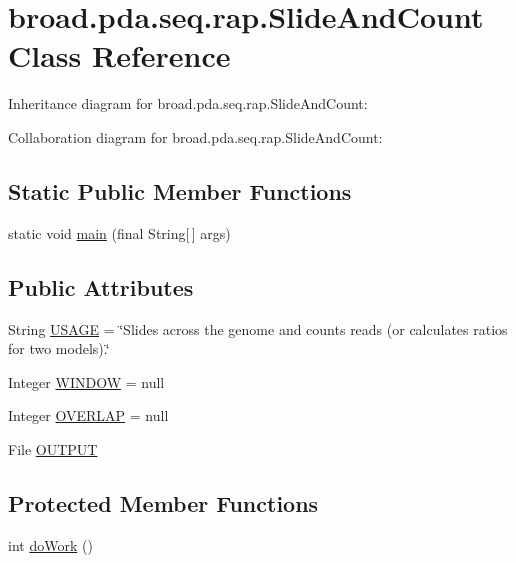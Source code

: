 \hypertarget{classbroad_1_1pda_1_1seq_1_1rap_1_1_slide_and_count}{\section{broad.\+pda.\+seq.\+rap.\+Slide\+And\+Count Class Reference}
\label{classbroad_1_1pda_1_1seq_1_1rap_1_1_slide_and_count}
}


Inheritance diagram for broad.\+pda.\+seq.\+rap.\+Slide\+And\+Count\+:


Collaboration diagram for broad.\+pda.\+seq.\+rap.\+Slide\+And\+Count\+:
\subsection*{Static Public Member Functions}
\begin{DoxyCompactItemize}
\item 
static void \hyperlink{classbroad_1_1pda_1_1seq_1_1rap_1_1_slide_and_count_a83db52ee201e85136f9c32328813b7c7}{main} (final String\mbox{[}$\,$\mbox{]} args)
\end{DoxyCompactItemize}
\subsection*{Public Attributes}
\begin{DoxyCompactItemize}
\item 
String \hyperlink{classbroad_1_1pda_1_1seq_1_1rap_1_1_slide_and_count_ac67e77a472d934625fa493ad461578ac}{U\+S\+A\+G\+E} = \char`\"{}Slides across the genome and counts reads (or calculates ratios for two models).\char`\"{}
\item 
Integer \hyperlink{classbroad_1_1pda_1_1seq_1_1rap_1_1_slide_and_count_a9be89664b1e7b15d1a5a5e9bfae6b3cb}{W\+I\+N\+D\+O\+W} = null
\item 
Integer \hyperlink{classbroad_1_1pda_1_1seq_1_1rap_1_1_slide_and_count_a380a0603d14792e097d500e7c5f6c41c}{O\+V\+E\+R\+L\+A\+P} = null
\item 
File \hyperlink{classbroad_1_1pda_1_1seq_1_1rap_1_1_slide_and_count_a257060b25d6c2b19701fb4d18d92a0e1}{O\+U\+T\+P\+U\+T}
\end{DoxyCompactItemize}
\subsection*{Protected Member Functions}
\begin{DoxyCompactItemize}
\item 
int \hyperlink{classbroad_1_1pda_1_1seq_1_1rap_1_1_slide_and_count_a8adde7a9f3cc3bd02653248a0092d3d7}{do\+Work} ()
\end{DoxyCompactItemize}
